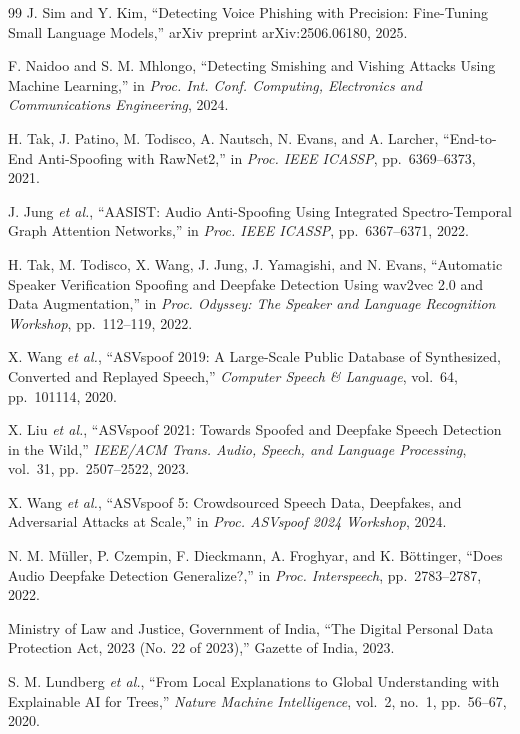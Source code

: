 \begin{thebibliography}{99}
J. Sim and Y. Kim, ``Detecting Voice Phishing with Precision: Fine-Tuning Small Language Models,'' arXiv preprint arXiv:2506.06180, 2025.

F. Naidoo and S. M. Mhlongo, ``Detecting Smishing and Vishing Attacks Using Machine Learning,'' in \textit{Proc. Int. Conf. Computing, Electronics and Communications Engineering}, 2024.

H. Tak, J. Patino, M. Todisco, A. Nautsch, N. Evans, and A. Larcher, ``End-to-End Anti-Spoofing with {RawNet2},'' in \textit{Proc. IEEE ICASSP}, pp.~6369--6373, 2021.

J. Jung \textit{et al.}, ``{AASIST}: Audio Anti-Spoofing Using Integrated Spectro-Temporal Graph Attention Networks,'' in \textit{Proc. IEEE ICASSP}, pp.~6367--6371, 2022.

H. Tak, M. Todisco, X. Wang, J. Jung, J. Yamagishi, and N. Evans, ``Automatic Speaker Verification Spoofing and Deepfake Detection Using wav2vec 2.0 and Data Augmentation,'' in \textit{Proc. Odyssey: The Speaker and Language Recognition Workshop}, pp.~112--119, 2022.

X. Wang \textit{et al.}, ``{ASVspoof} 2019: A Large-Scale Public Database of Synthesized, Converted and Replayed Speech,'' \textit{Computer Speech \& Language}, vol.~64, pp.~101114, 2020.

X. Liu \textit{et al.}, ``{ASVspoof} 2021: Towards Spoofed and Deepfake Speech Detection in the Wild,'' \textit{IEEE/ACM Trans. Audio, Speech, and Language Processing}, vol.~31, pp.~2507--2522, 2023.

X. Wang \textit{et al.}, ``{ASVspoof} 5: Crowdsourced Speech Data, Deepfakes, and Adversarial Attacks at Scale,'' in \textit{Proc. ASVspoof 2024 Workshop}, 2024.

N. M. M{\"u}ller, P. Czempin, F. Dieckmann, A. Froghyar, and K. B{\"o}ttinger, ``Does Audio Deepfake Detection Generalize?,'' in \textit{Proc. Interspeech}, pp.~2783--2787, 2022.

Ministry of Law and Justice, Government of India, ``The Digital Personal Data Protection Act, 2023 (No. 22 of 2023),'' Gazette of India, 2023.

S. M. Lundberg \textit{et al.}, ``From Local Explanations to Global Understanding with Explainable {AI} for Trees,'' \textit{Nature Machine Intelligence}, vol.~2, no.~1, pp.~56--67, 2020.


\end{thebibliography}

